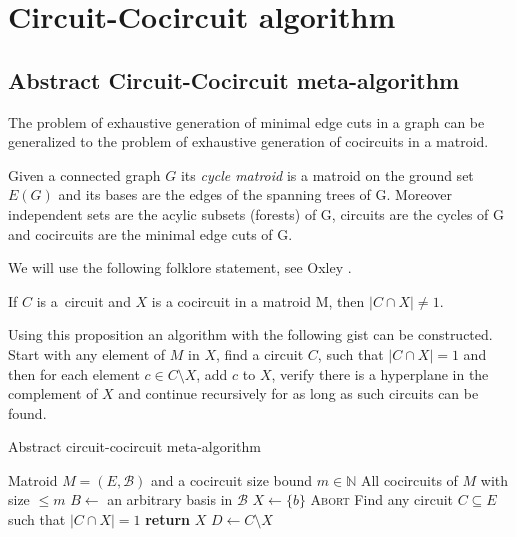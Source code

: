 \chapter{Circuit-Cocircuit algorithm}
\label{ch:algorithm}

\section{Abstract Circuit-Cocircuit meta-algorithm}

The problem of exhaustive generation of minimal edge cuts in \linebreak a graph can be generalized to the problem of exhaustive generation of cocircuits in a matroid.

\begin{defn}
	\label{cycle_matroid}
	Given a connected graph $G$ its \textit{cycle matroid} is a matroid on the ground set $E(G)$ and its bases are the edges of the spanning trees of G. Moreover independent sets are the acylic subsets (forests) of G, circuits are the cycles of G and cocircuits are the minimal edge cuts of G.
\end{defn}

We will use the following folklore statement, see Oxley \cite{oxley2006matroid}.

\begin{prop}
	\label{prop_circuit-cocircuit}
	If $C$ is a~circuit and $X$ is a cocircuit in a matroid M, then ${\lvert C \cap X \rvert \neq 1}$.
\end{prop}

Using this proposition an algorithm with the following gist can be constructed. Start with any element of $M$ in $X$, find a circuit $C$, such that \linebreak ${\lvert C \cap X \rvert = 1}$ and then for each element $c \in C \setminus X$, add $c$ to $X$, verify there is a hyperplane in the complement of $X$ and continue recursively for as long as such circuits can be found.

\clearpage

\begin{algorithm}
	\caption{Abstract circuit-cocircuit meta-algorithm}
	\label{meta-algorithm}
\begin{algorithmic}[1]
	\Require Matroid $M = (E, \mathcal{B})$ and a cocircuit size bound $m \in \mathbb{N}$
	\Ensure All cocircuits of $M$ with size $\leq m$
	\State $B \leftarrow$ an arbitrary basis in $\mathcal{B}$
		\State $X \leftarrow \{b\}$
		\State {}
	\EndFor
		\State \textsc{Abort}
	\EndIf
	\State Find any circuit $C \subseteq E$ such that $\lvert C \cap X \rvert = 1$
		\State \textbf{return} $X$ 
	\Else
		\State $D \leftarrow C \setminus X$
			\State {}
		\EndFor
	\EndIf

	\EndProcedure
\end{algorithmic}
\end{algorithm}

